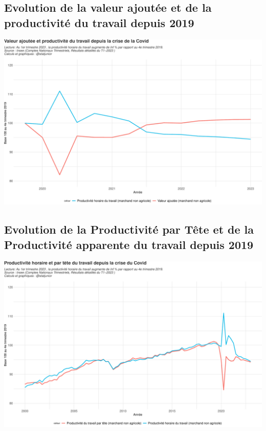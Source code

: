 \documentclass[
  paper=a4,
  ,captions=tableheading
]{scrartcl}
\begin{document}
\hypertarget{evolution-de-la-valeur-ajoutuxe9e-et-de-la-productivituxe9-du-travail-depuis-2019}{%
\subsection{Evolution de la valeur ajoutée et de la productivité du
travail depuis
2019}\label{evolution-de-la-valeur-ajoutuxe9e-et-de-la-productivituxe9-du-travail-depuis-2019}}

\includegraphics{rapport_pdf_compte_branche_files/figure-latex/unnamed-chunk-18-1.pdf}

\hypertarget{evolution-de-la-productivituxe9-par-tuxeate-et-de-la-productivituxe9-apparente-du-travail-depuis-2019}{%
\subsection{Evolution de la Productivité par Tête et de la Productivité
apparente du travail depuis
2019}\label{evolution-de-la-productivituxe9-par-tuxeate-et-de-la-productivituxe9-apparente-du-travail-depuis-2019}}

\includegraphics{rapport_pdf_compte_branche_files/figure-latex/unnamed-chunk-19-1.pdf}
\end{document}
